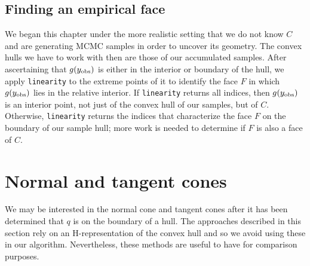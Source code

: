 \subsection{Finding an empirical face}
We began this chapter under the more realistic setting that we do not know
$C$ and are generating MCMC samples in order to uncover its geometry.  
The convex hulls we have to work with then are those of our accumulated samples.
After ascertaining that $g(y_{\text{obs}})$ is either in the interior
or boundary of the hull, we apply \texttt{linearity} to the extreme points of it 
to identify the face $F$ in which $g(y_{\text{obs}})$ lies in the relative interior.  
If \texttt{linearity} returns all indices, then $g(y_{\text{obs}})$ is an interior point, not just
of the convex hull of our samples, but of $C$.  Otherwise, \texttt{linearity} returns 
the indices that characterize the face $F$ on the boundary of our sample hull; more work is 
needed to determine if $F$ is also a face of $C$.


\section{Normal and tangent cones}
We may be interested in the normal cone and tangent cones after it has been
determined that $q$ is on the boundary of a  hull.  The approaches described
in this section rely on an H-representation of the convex hull and so we avoid 
using these in our algorithm.  Nevertheless, these methods are useful to have for
comparison purposes.

